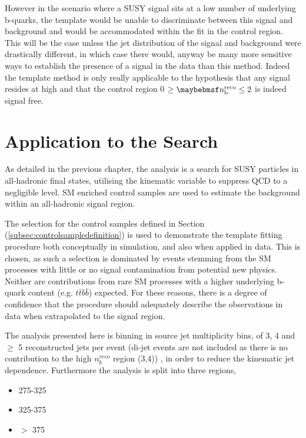 However in the scenario where a \ac{SUSY} signal sits at a low number of underlying b-quarks, the template would be unable to discriminate between this signal and background and would be accommodated within the fit in the control region. This will be the case unless the jet \pt distribution of the signal and background were drastically different, in which case there would, anyway be many more sensitive ways to establish the presence of a signal in the data than this method. Indeed the template method is only really applicable to the hypothesis that any signal resides at high \nbreco and that the control region 0 $\geq \nbreco \leq 2$ is indeed signal free.  



\section{ Application to the \alphat Search}
\label{sec:templateapplication}

As detailed in the previous chapter, the \alphat analysis is a search for \ac{SUSY} particles in all-hadronic final states, utilising the kinematic variable \alphat to suppress QCD to a negligible level. \ac{SM} enriched control samples are used to estimate the background within an all-hadronic signal region. 

The selection for the \mupjets control samples defined in Section (\ref{subsec:controlsampledefinition}) is used to demonstrate the template fitting procedure both conceptually in simulation, and also when applied in data. This is chosen, as such a selection is dominated by events stemming from the \ac{SM} processes with little or no signal contamination from potential new physics. Neither are contributions from rare \ac{SM} processes with a higher underlying b-quark content (e.g. $t\bar{t}b\bar{b}$) expected. For these reasons, there is a degree of confidence that the procedure should adequately describe the observations in data when extrapolated to the signal region.

The analysis presented here is binning in source jet multiplicity bins, of 3, 4 and $\geq$ 5 reconstructed jets per event (di-jet events are not included as there is no contribution to the high $n_{b}^{reco}$ region (3,4)) , in order to reduce the kinematic jet \pt dependence. Furthermore the analysis is split into three \theht regions, 

\begin{itemize}
\item 275-325 \GeV
\item 325-375 \GeV
\item $>$ 375 \GeV
\end{itemize}

